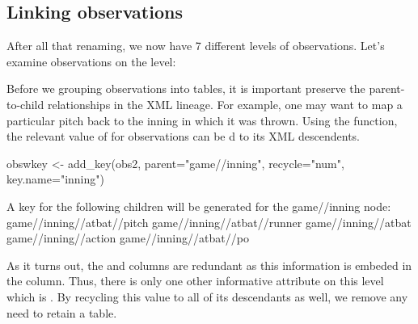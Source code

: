 \begin{article}
\subsection{Linking observations}

After all that renaming, we now have 7
different levels of observations. Let's examine observations on the
 level:

\begin{Schunk}
\end{Schunk}


Before we grouping observations into tables, it is important preserve
the parent-to-child relationships in the XML lineage. For example,
one may want to map a particular pitch back to the inning in which
it was thrown. Using the  function, the relevant value
of  for  observations can be d
to its XML descendents.

\begin{Schunk}
\begin{Sinput}
obswkey <- add_key(obs2, parent="game//inning", recycle="num", key.name="inning")
\end{Sinput}
\begin{Soutput}
A key for the following children will be generated for the game//inning node:
game//inning//atbat//pitch
game//inning//atbat//runner
game//inning//atbat
game//inning//action
game//inning//atbat//po
\end{Soutput}
\end{Schunk}


As it turns out, the  and  columns
are redundant as this information is embeded in the  column.
Thus, there is only one other informative attribute on this level
which is . By recycling this value to all of its descendants
as well, we remove any need to retain a  table.


\end{article}
